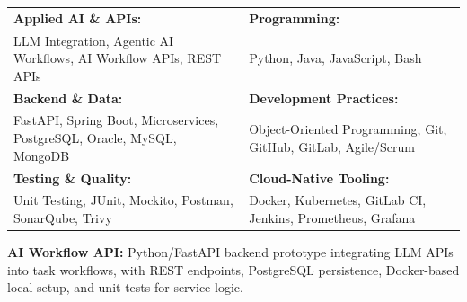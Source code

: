 \renewcommand{\arraystretch}{1.2}

\begin{tabular}{p{} p{}}
    \textbf{Applied AI \& APIs:} & \textbf{Programming:} \\
    LLM Integration, Agentic AI Workflows, AI Workflow APIs, REST APIs & Python, Java, JavaScript, Bash \\

    \textbf{Backend \& Data:} & \textbf{Development Practices:} \\
    FastAPI, Spring Boot, Microservices, PostgreSQL, Oracle, MySQL, MongoDB & Object-Oriented Programming, Git, GitHub, GitLab, Agile/Scrum \\

    \textbf{Testing \& Quality:} & \textbf{Cloud-Native Tooling:} \\
    Unit Testing, JUnit, Mockito, Postman, SonarQube, Trivy & Docker, Kubernetes, GitLab CI, Jenkins, Prometheus, Grafana \\
\end{tabular}


\textbf{AI Workflow API:} Python/FastAPI backend prototype integrating LLM APIs into task workflows, with REST endpoints, PostgreSQL persistence, Docker-based local setup, and unit tests for service logic.
